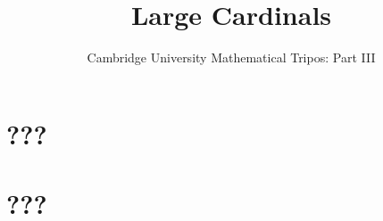 \documentclass{article}
\title{Large Cardinals}
\author{Cambridge University Mathematical Tripos: Part III}
\begin{document}
\maketitle

\tableofcontentsnewpage{}

\section{???}

\section{???}

\end{document}
